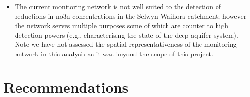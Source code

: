 \begin{itemize}
    \item The current monitoring network is not well suited to the detection of reductions in \gls{no3n} concentrations in the Selwyn Waihora catchment; however the network serves multiple purposes some of which are counter to high detection powers (e.g., characterising the state of the deep aquifer system). Note we have not assessed the spatial representativeness of the monitoring network in this analysis as it was beyond the scope of this project.
\end{itemize}

\pagebreak
\section[Recommendations]{Recommendations} \label{sec:recommendations}


